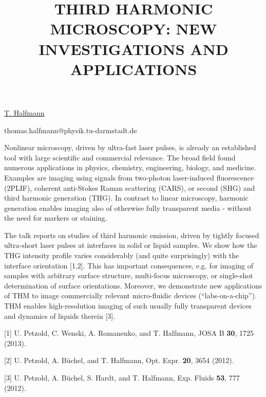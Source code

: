 \title{THIRD HARMONIC MICROSCOPY: NEW INVESTIGATIONS AND APPLICATIONS}

\underline{T. Halfmann} 

{\normalsize{\vspace{-4mm}
\darmstadt

\email thomas.halfmann@physik.tu-darmstadt.de}}

Nonlinear microscopy, driven by ultra-fast laser pulses, is already an established tool with large scientific and commercial relevance. The broad field found numerous applications in physics, chemistry, engineering, biology, and medicine. Examples are imaging using signals from two-photon laser-induced fluorescence (2PLIF), coherent anti-Stokes Raman scattering (CARS), or second (SHG) and third harmonic generation (THG). In contrast to linear microscopy, harmonic generation enables imaging also of otherwise fully transparent media - without the need for markers or staining.

The talk reports on studies of third harmonic emission, driven by tightly focused ultra-short laser pulses at interfaces in solid or liquid samples. We show how the THG intensity profile varies considerably (and quite surprisingly) with the interface orientation [1,2]. This has important consequences, e.g. for imaging of samples with arbitrary surface structure, multi-focus microscopy, or single-shot determination of surface orientations. Moreover, we demonstrate new applications of THM to image commercially relevant micro-fluidic devices (“labs-on-a-chip”). THM enables high-resolution imaging of such usually fully transparent devices and dynamics of liquids therein [3].

{\normalsize
[1] U. Petzold, C. Wenski, A. Romanenko, and T. Halfmann, JOSA B \textbf{30}, 1725 (2013).
\vsp

[2] U. Petzold, A. B\"{u}chel, and T. Halfmann, Opt. Expr. \textbf{20}, 3654 (2012).
\vsp

[3] U. Petzold, A. B\"{u}chel, S. Hardt, and T. Halfmann, Exp. Fluids \textbf{53}, 777 (2012).
}

\vspace{\baselineskip}
